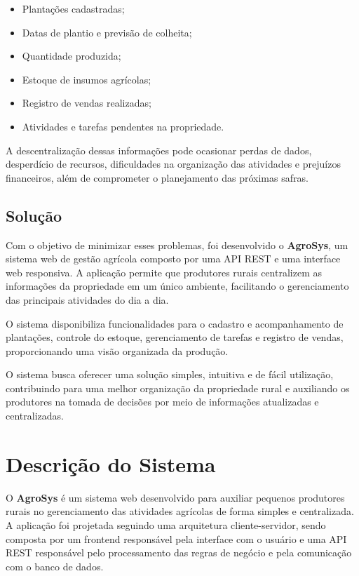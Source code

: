 \documentclass[12pt]{article}
\begin{document}
\begin{itemize}
  \item Plantações cadastradas;
  \item Datas de plantio e previsão de colheita;
  \item Quantidade produzida;
  \item Estoque de insumos agrícolas;
  \item Registro de vendas realizadas;
  \item Atividades e tarefas pendentes na propriedade.
\end{itemize}

A descentralização dessas informações pode ocasionar perdas de dados, desperdício de recursos, dificuldades na organização das atividades e prejuízos financeiros, além de comprometer o planejamento das próximas safras.

\subsection{Solução}

Com o objetivo de minimizar esses problemas, foi desenvolvido o \textbf{AgroSys}, um sistema web de gestão agrícola composto por uma API REST e uma interface web responsiva. A aplicação permite que produtores rurais centralizem as informações da propriedade em um único ambiente, facilitando o gerenciamento das principais atividades do dia a dia.

O sistema disponibiliza funcionalidades para o cadastro e acompanhamento de plantações, controle do estoque, gerenciamento de tarefas e registro de vendas, proporcionando uma visão organizada da produção.

O sistema busca oferecer uma solução simples, intuitiva e de fácil utilização, contribuindo para uma melhor organização da propriedade rural e auxiliando os produtores na tomada de decisões por meio de informações atualizadas e centralizadas.


\section{Descrição do Sistema} 
O \textbf{AgroSys} é um sistema web desenvolvido para auxiliar pequenos produtores rurais no gerenciamento das atividades agrícolas de forma simples e centralizada. A aplicação foi projetada seguindo uma arquitetura cliente-servidor, sendo composta por um frontend responsável pela interface com o usuário e uma API REST responsável pelo processamento das regras de negócio e pela comunicação com o banco de dados. 
\end{document}
